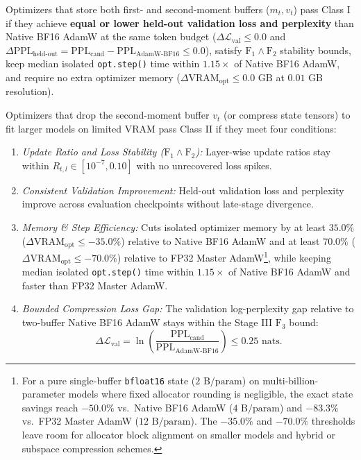 \documentclass[11pt,a4paper]{article}
\renewcommand{\_}{\origunderscore\allowbreak}
\begin{document}
\begin{description}[style=unboxed, leftmargin=1.8em, itemsep=0.45em]
    \item[Class I. Dual-Buffer / Full-State Optimizers ($\ge 4$~bytes/param):] Optimizers that store both first- and second-moment buffers ($m_t, v_t$) pass Class I if they achieve \textbf{equal or lower held-out validation loss and perplexity} than Native BF16 AdamW at the same token budget ($\Delta\mathcal{L}_{\text{val}} \le 0.0$ and $\Delta\text{PPL}_{\text{held-out}} = \text{PPL}_{\text{cand}} - \text{PPL}_{\text{AdamW-BF16}} \le 0.0$), satisfy $\text{F}_1 \wedge \text{F}_2$ stability bounds, keep median isolated \texttt{opt.step()} time within $1.15\times$ of Native BF16 AdamW, and require no extra optimizer memory ($\Delta\text{VRAM}_{\text{opt}} \le 0.0\text{ GB}$ at $0.01\text{ GB}$ resolution).

    \item[Class II. Single-Buffer / Compressed-State Optimizers ($\le 2$~bytes/param):] Optimizers that drop the second-moment buffer $v_t$ (or compress state tensors) to fit larger models on limited VRAM pass Class II if they meet four conditions:
    \begin{enumerate}[label=(\alph*), leftmargin=1.8em, itemsep=0.25em]
        \item \textit{Update Ratio and Loss Stability ($\text{F}_1 \wedge \text{F}_2$):} Layer-wise update ratios stay within $R_{t,l} \in [10^{-7}, 0.10]$ with no unrecovered loss spikes.
        \item \textit{Consistent Validation Improvement:} Held-out validation loss and perplexity improve across evaluation checkpoints without late-stage divergence.
        \item \textit{Memory \& Step Efficiency:} Cuts isolated optimizer memory by at least $35.0\%$ ($\Delta\text{VRAM}_{\text{opt}} \le -35.0\%$) relative to Native BF16 AdamW and at least $70.0\%$ ($\Delta\text{VRAM}_{\text{opt}} \le -70.0\%$) relative to FP32 Master AdamW\footnote{For a pure single-buffer \texttt{bfloat16} state ($2\text{ B/param}$) on multi-billion-parameter models where fixed allocator rounding is negligible, the exact state savings reach $-50.0\%$ vs.\ Native BF16 AdamW ($4\text{ B/param}$) and $-83.3\%$ vs.\ FP32 Master AdamW ($12\text{ B/param}$). The $-35.0\%$ and $-70.0\%$ thresholds leave room for allocator block alignment on smaller models and hybrid or subspace compression schemes.}, while keeping median isolated \texttt{opt.step()} time within $1.15\times$ of Native BF16 AdamW and faster than FP32 Master AdamW.
        \item \textit{Bounded Compression Loss Gap:} The validation log-perplexity gap relative to two-buffer Native BF16 AdamW stays within the Stage III $\text{F}_3$ bound:
        \begin{equation}
            \Delta\mathcal{L}_{\text{val}} = \ln\!\left(\frac{\text{PPL}_{\text{cand}}}{\text{PPL}_{\text{AdamW-BF16}}}\right) \le 0.25\text{ nats}.
        \end{equation}
    \end{enumerate}
\end{description}
\end{document}
